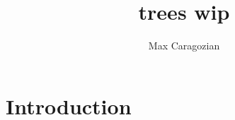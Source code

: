 \documentclass[]{article}
\title{trees wip}
\author{Max Caragozian}
\begin{document}
\maketitle

\section{Introduction}
\end{document}
